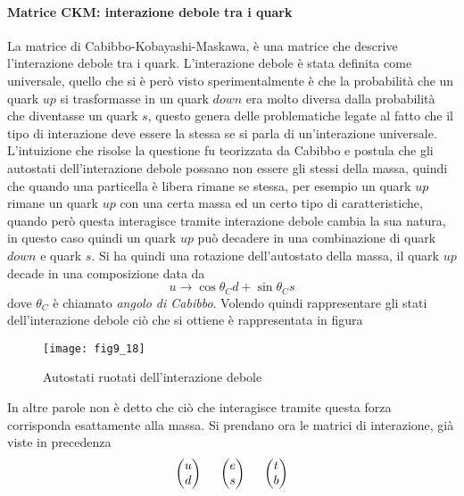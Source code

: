 \paragraph{Matrice CKM: interazione debole tra i quark}
La matrice di Cabibbo-Kobayashi-Maskawa, è una matrice che descrive l'interazione debole tra i quark.
L'interazione debole è stata definita come universale, quello che si è però visto sperimentalmente è che la probabilità che un quark $up$ si trasformasse in un quark $down$ era molto diversa dalla probabilità che diventasse un quark $s$, questo genera delle problematiche legate al fatto che il tipo di interazione deve essere la stessa se si parla di un'interazione universale.
L'intuizione che risolse la questione fu teorizzata da Cabibbo e postula che gli autostati dell'interazione debole possano non essere gli stessi della massa, quindi che quando una particella è libera rimane se stessa, per esempio un quark $up$ rimane un quark $up$ con una certa massa ed un certo tipo di caratteristiche, quando però questa interagisce tramite interazione debole cambia la sua natura, in questo caso quindi un quark $up$ può decadere in una combinazione di quark $down$ e quark $s$.
Si ha quindi una rotazione dell'autostato della massa, il quark $up$ decade in una composizione data da
\begin{equation}
u\longrightarrow \cos\theta_C d+\sin\theta_C s
\end{equation}
dove $\theta_C$ è chiamato \emph{angolo di Cabibbo}.
Volendo quindi rappresentare gli stati dell'interazione debole ciò che si ottiene è rappresentata in figura
\begin{figure}[h]
\centering
\texttt{[image: fig9\_18]}
\caption{Autostati ruotati dell'interazione debole}
\end{figure}
In altre parole non è detto che ciò che interagisce tramite questa forza corrisponda esattamente alla massa.
Si prendano ora le matrici di interazione, già viste in precedenza
\begin{equation}
\begin{pmatrix}
u\\d
\end{pmatrix}
\hspace{0.5cm}
\begin{pmatrix}
e\\s
\end{pmatrix}
\hspace{0.5cm}
\begin{pmatrix}
t\\b
\end{pmatrix}
\end{equation}

